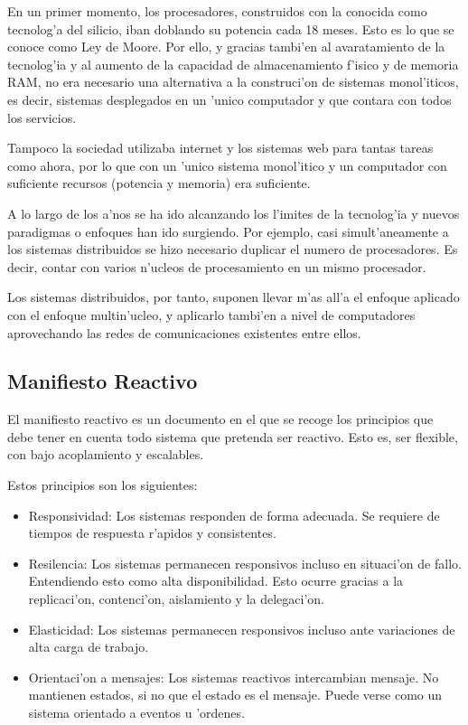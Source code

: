 \documentclass[12pt]{article}
\begin{document}
En un primer momento, los procesadores, construidos con la conocida como tecnolog'a del
silicio, iban doblando su potencia cada 18 meses. Esto es lo que se conoce como Ley de Moore.
Por ello, y gracias tambi'en al avaratamiento de la tecnolog'ia y al aumento de la capacidad de
almacenamiento f'isico y de memoria RAM, no era necesario una alternativa a la construci'on de sistemas
monol'iticos, es decir, sistemas desplegados en un 'unico computador y que contara con
todos los servicios.

Tampoco la sociedad utilizaba internet y los sistemas web para tantas tareas como ahora, por lo
que con un 'unico sistema monol'itico y un computador con suficiente recursos (potencia y memoria)
era suficiente.

A lo largo de los a'nos se ha ido alcanzando los l'imites de la tecnolog'ia y nuevos paradigmas o
enfoques han ido surgiendo. Por ejemplo, casi simult'aneamente a los sistemas distribuidos se
hizo necesario duplicar el numero de procesadores. Es decir, contar con varios n'ucleos de
procesamiento en un mismo procesador.

Los sistemas distribuidos, por tanto, suponen llevar m'as all'a el enfoque aplicado con el enfoque
multin'ucleo, y aplicarlo tambi'en a nivel de computadores aprovechando las redes de comunicaciones
existentes entre ellos.

\subsection{Manifiesto Reactivo}
\label{sub:manifiesto reactivo}
El manifiesto reactivo es un documento en el que se recoge los principios que debe
tener en cuenta todo sistema que pretenda ser reactivo. Esto es, ser flexible, con bajo
acoplamiento y escalables.

Estos principios son los siguientes:

\begin{itemize}
	\item Responsividad: Los sistemas responden de forma adecuada. Se requiere de tiempos
    de respuesta r'apidos y consistentes.
	\item Resilencia: Los sistemas permanecen responsivos incluso en situaci'on de fallo.
    Entendiendo esto como alta disponibilidad. Esto ocurre gracias a la replicaci'on, contenci'on,
    aislamiento y la delegaci'on.
	\item Elasticidad: Los sistemas permanecen responsivos incluso ante variaciones de alta
    carga de trabajo.
	\item Orientaci'on a mensajes: Los sistemas reactivos intercambian mensaje. No mantienen estados,
    si no que el estado es el mensaje. Puede verse como un sistema orientado a eventos u 'ordenes.
\end{itemize}
\end{document}
